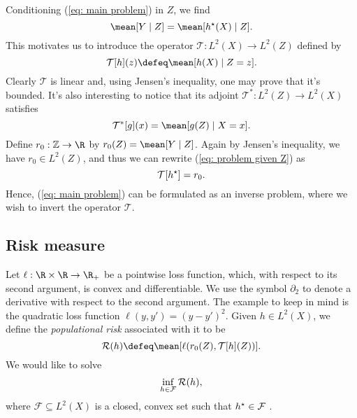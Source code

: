 Conditioning (\ref{eq: main problem}) in $ Z $, we find
\begin{equation}
    \label{eq: problem given Z}
    \mean [ Y \mid Z ] = \mean [ \hstar ( X ) \mid Z ]
.\end{equation}
This motivates us to introduce the operator $ \mathcal{T} : L^{ 2 } ( X ) \to L^{ 2 } ( Z ) $ defined by
\begin{equation*}
    \mathcal{T} [ h ] ( z ) \defeq \mean [ h ( X ) \mid Z = z ]
.\end{equation*}
Clearly $ \mathcal{T} $ is linear and, using Jensen's inequality, one may prove that it's bounded.
It's also interesting to notice that its adjoint $ \mathcal{T}^{ * } : L^{ 2 } ( Z ) \to L^{ 2 } ( X ) $ satisfies
\begin{equation}
    \label{eq: T adjoint}
    \mathcal{T}^{ * } [ g ] ( x ) = \mean [ g ( Z ) \mid X = x ].
\end{equation}
Define $ r_{ 0 } : \mathbb{Z} \to \R $ by $ r_{ 0 } ( Z ) = \mean [ Y \mid Z ] $.
Again by Jensen's inequality, we have $ r_{ 0 } \in L^{ 2 } ( Z ) $, and thus we can rewrite (\ref{eq: problem given Z}) as
\begin{equation}
    \label{eq: problem with T}
    \mathcal{T} [ h^{ \star } ] = r_{ 0 }
.\end{equation}
Hence, (\ref{eq: main problem}) can be formulated as an inverse problem, where we wish to invert the operator $ \mathcal{T} $.

\subsection{Risk measure}

Let $ \ell : \R \times \R \to \R_{ + } $ be a pointwise loss function, which, with respect to its second argument, is convex and differentiable.
We use the symbol $ \partial_{ 2 } $ to denote a derivative with respect to the second argument.
The example to keep in mind is the quadratic loss function $ \ell ( y, y' ) = ( y - y' )^2 $.
Given $ h \in L^{ 2 } ( X ) $, we define the \emph{populational risk} associated with it to be
\begin{equation*}
    \risk ( h ) \defeq \mean [ \ell ( r_{ 0 } ( Z ), \mathcal{T} [ h ] ( Z ) ) ]
.\end{equation*}
We would like to solve
\begin{equation*}
    \inf_{ h \in \mathcal{F} } \mathcal{R} ( h )
,\end{equation*}
where $ \mathcal{F} \subseteq L^{ 2 } ( X ) $ is a closed, convex set such that $ h^{ \star } \in \mathcal{F} $ .
